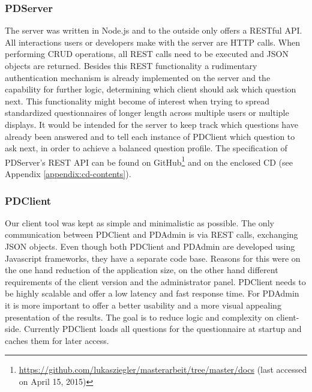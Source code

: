 	\subsubsection{PDServer}

		The server was written in Node.js and to the outside only offers a RESTful API. All interactions users or developers make with the server are HTTP calls. When performing CRUD operations, all REST calls need to be executed and JSON objects are returned.
		Besides this REST functionality a rudimentary authentication mechanism is already implemented on the server and the capability for further logic, determining which client should ask which question next. This functionality might become of interest when trying to spread standardized questionnaires of longer length across multiple users or multiple displays. It would be intended for the server to keep track which questions have already been answered and to tell each instance of PDClient which question to ask next, in order to achieve a balanced question profile.
		The specification of PDServer's REST API can be found on GitHub\footnote{\url{https://github.com/lukasziegler/masterarbeit/tree/master/docs} (last accessed on April 15, 2015)} and on the enclosed CD (see Appendix \ref{appendix:cd-contents}).



	\subsubsection{PDClient}

		Our client tool was kept as simple and minimalistic as possible. The only communication between PDClient and PDAdmin is via REST calls, exchanging JSON objects. Even though both PDClient and PDAdmin are developed using Javascript frameworks, they have a separate code base. Reasons for this were on the one hand reduction of the application size, on the other hand different requirements of the client version and the administrator panel. PDClient needs to be highly scalable and offer a low latency and fast response time. For PDAdmin it is more important to offer a better usability and a more visual appealing presentation of the results. The goal is to reduce logic and complexity on client-side. Currently PDClient loads all questions for the questionnaire at startup and caches them for later access. 

